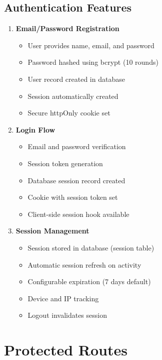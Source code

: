 \documentclass[12pt,a4paper]{report}
\begin{document}
\subsection{Authentication Features}

\begin{enumerate}
    \item \textbf{Email/Password Registration}
    \begin{itemize}
        \item User provides name, email, and password
        \item Password hashed using bcrypt (10 rounds)
        \item User record created in database
        \item Session automatically created
        \item Secure httpOnly cookie set
    \end{itemize}
    
    \item \textbf{Login Flow}
    \begin{itemize}
        \item Email and password verification
        \item Session token generation
        \item Database session record created
        \item Cookie with session token set
        \item Client-side session hook available
    \end{itemize}
    
    \item \textbf{Session Management}
    \begin{itemize}
        \item Session stored in database (session table)
        \item Automatic session refresh on activity
        \item Configurable expiration (7 days default)
        \item Device and IP tracking
        \item Logout invalidates session
    \end{itemize}
\end{enumerate}

\section{Protected Routes}
\end{document}
